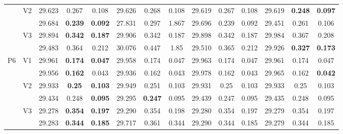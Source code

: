 \documentclass[12pt,a4paper]{article}
\begin{document}
\begin{sidewaystable}[ht]
{\begin{tabular}{cc|ccc|ccc|ccc|ccc|}
   & \multirow{2}{*}{V2} & 29.623 & 0.267 & 0.108 & 29.626 & 0.268 & 0.108 & 29.619 & 0.267 & 0.108 & 29.619 & \textbf{0.248} & \textbf{0.097} \\ 
   &  & 29.684 & \textbf{0.239} & \textbf{0.092} & 27.831 & 0.297 & 1.867 & 29.696 & 0.239 & 0.092 & 29.451 & 0.261 & 0.106 \\ 
   & \multirow{2}{*}{V3} & 29.894 & \textbf{0.342} & \textbf{0.187} & 29.906 & 0.342 & 0.187 & 29.898 & 0.342 & 0.187 & 29.984 & 0.367 & 0.208 \\ 
   &  & 29.483 & 0.364 & 0.212 & 30.076 & 0.447 & 1.85 & 29.510 & 0.365 & 0.212 & 29.926 & \textbf{0.327} & \textbf{0.173} \\ 
   \hline \hline\multirow{6}{*}{P6} & \multirow{2}{*}{V1} & 29.961 & \textbf{0.174} & \textbf{0.047} & 29.958 & 0.174 & 0.047 & 29.963 & 0.174 & 0.047 & 29.961 & 0.174 & 0.047 \\ 
   &  & 29.956 & \textbf{0.162} & 0.043 & 29.936 & 0.162 & 0.043 & 29.978 & 0.162 & 0.043 & 29.965 & 0.162 & \textbf{0.042} \\ 
   & \multirow{2}{*}{V2} & 29.933 & \textbf{0.25} & \textbf{0.103} & 29.949 & 0.251 & 0.103 & 29.931 & 0.25 & 0.103 & 29.933 & 0.25 & 0.103 \\ 
   &  & 29.434 & 0.248 & \textbf{0.095} & 29.295 & \textbf{0.247} & 0.095 & 29.439 & 0.247 & 0.095 & 29.435 & 0.248 & 0.095 \\ 
   & \multirow{2}{*}{V3} & 29.278 & \textbf{0.354} & \textbf{0.197} & 29.290 & 0.354 & 0.198 & 29.280 & 0.354 & 0.197 & 29.279 & 0.354 & 0.197 \\ 
   &  & 29.283 & \textbf{0.344} & \textbf{0.185} & 29.717 & 0.361 & 0.344 & 29.290 & 0.344 & 0.185 & 29.279 & 0.344 & 0.185 \\ 
   \hline
\end{tabular}
}
\end{sidewaystable}
\end{document}
